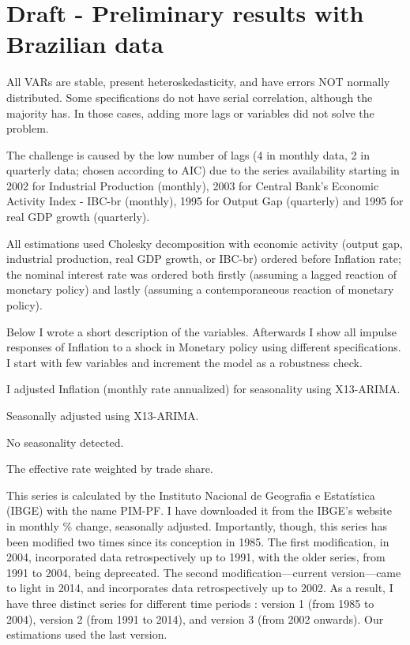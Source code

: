 

%    
%    
%    
    
\section{Draft - Preliminary results with Brazilian data}

All VARs are stable, present heteroskedasticity, and have errors NOT normally distributed.
Some specifications do not have serial correlation, although the majority has. In those cases, adding more lags or variables did not solve the problem.

The challenge is caused by the low number of lags (4 in monthly data, 2 in quarterly data; chosen according to AIC) due to the series availability starting in 2002 for Industrial Production (monthly), 2003 for Central Bank's Economic Activity Index - IBC-br (monthly), 1995 for Output Gap (quarterly) and 1995 for real GDP growth (quarterly).

All estimations used Cholesky decomposition with economic activity (output gap, industrial production, real GDP growth, or IBC-br) ordered before Inflation rate; the nominal interest rate was ordered both firstly (assuming a lagged reaction of monetary policy) and lastly (assuming a contemporaneous reaction of monetary policy).

Below I wrote a short description of the variables. Afterwards I show all impulse responses of Inflation to a shock in Monetary policy using different specifications. I start with few variables and increment the model as a robustness check.


I adjusted Inflation (monthly rate annualized) for seasonality using X13-ARIMA.

Seasonally adjusted using X13-ARIMA.

No seasonality detected.

The effective rate weighted by trade share.

This series is calculated by the Instituto Nacional de Geografia e Estatística (IBGE) with the name PIM-PF. I have downloaded it from the IBGE's website in monthly \% change, seasonally adjusted. Importantly, though, this series has been modified two times since its conception in 1985. The first modification, in 2004, incorporated data retrospectively up to 1991, with the older series, from 1991 to 2004, being deprecated. The second modification---current version---came to light in 2014, and incorporates data retrospectively up to 2002. As a result, I have three distinct series for different time periods : version 1 (from 1985 to 2004), version 2 (from 1991 to 2014), and version 3 (from 2002 onwards). Our estimations used the last version.

